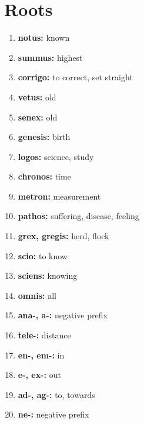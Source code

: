 \documentclass{article}
\begin{document}
\section{Roots}
\begin{enumerate}
    \item \textbf{notus: }{known}
    \item \textbf{summus: }{highest}
    \item \textbf{corrigo: }{to correct, set straight}
    \item \textbf{vetus: }{old}
    \item \textbf{senex: }{old}
    \item \textbf{genesis: }{birth}
    \item \textbf{logos: }{science, study}
    \item \textbf{chronos: }{time}
    \item \textbf{metron: }{measurement}
    \item \textbf{pathos: }{suffering, disease, feeling}
    \item \textbf{grex, gregis: }{herd, flock}
    \item \textbf{scio: }{to know}
    \item \textbf{sciens: }{knowing}
    \item \textbf{omnis: }{all}
    \item \textbf{ana-, a-: }{negative prefix}
    \item \textbf{tele-: }{distance}
    \item \textbf{en-, em-: }{in}
    \item \textbf{e-, ex-: }{out}
    \item \textbf{ad-, ag-: }{to, towards}
    \item \textbf{ne-: }{negative prefix}
    
\end{enumerate}
\end{document}
